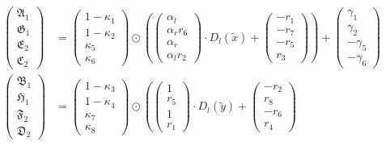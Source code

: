 \begin{align*}
\begin{pmatrix}
  \mathfrak{A}_1\\\mathfrak{G}_1\\\mathfrak{E}_2\\\mathfrak{C}_2
\end{pmatrix} & =
\begin{pmatrix}1-\kappa_1\\1-\kappa_2\\\kappa_5\\\kappa_6\end{pmatrix} \odot
  \left(
  \begin{pmatrix}\alpha_l\\\alpha_r r_6\\\alpha_r\\\alpha_l r_2\end{pmatrix}
    \cdot D_l(\widetilde{x}) +
  \begin{pmatrix}-r_1\\-r_7\\-r_5\\r_3\end{pmatrix}
  \right) +
\begin{pmatrix}\gamma_1\\\gamma_2\\-\gamma_5\\-\gamma_6\end{pmatrix}\\
\begin{pmatrix}
  \mathfrak{B}_1\\\mathfrak{H}_1\\\mathfrak{F}_2\\\mathfrak{D}_2
\end{pmatrix} & =
\begin{pmatrix}1-\kappa_3\\1-\kappa_4\\\kappa_7\\\kappa_8\end{pmatrix} \odot
  \left(
  \begin{pmatrix}1\\r_5\\1\\r_1\end{pmatrix}
    \cdot D_l(\widetilde{y}) +
  \begin{pmatrix}-r_2\\r_8\\-r_6\\r_4\end{pmatrix}

\end{align*}
